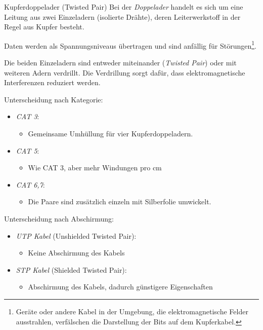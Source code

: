 \begin{defi}{Kupferdoppelader (Twisted Pair)}
    Bei der \emph{Doppelader} handelt es sich um eine Leitung aus zwei Einzeladern (isolierte Drähte), deren Leiterwerkstoff in der Regel aus Kupfer besteht.

    Daten werden als Spannungsniveaus übertragen und sind anfällig für Störungen\footnote{Geräte oder andere Kabel in der Umgebung, die elektromagnetische Felder ausstrahlen, verfälschen die Darstellung der Bits auf dem Kupferkabel.}.

    Die beiden Einzeladern sind entweder miteinander (\emph{Twisted Pair}) oder mit weiteren Adern verdrillt.
    Die Verdrillung sorgt dafür, dass elektromagnetische Interferenzen reduziert werden.

    Unterscheidung nach Kategorie:
    \begin{itemize}
        \item \emph{CAT 3}:
              \begin{itemize}
                  \item Gemeinsame Umhüllung für vier Kupferdoppeladern.
              \end{itemize}
        \item \emph{CAT 5}:
              \begin{itemize}
                  \item Wie CAT 3, aber mehr Windungen pro cm
              \end{itemize}
        \item \emph{CAT 6,7}:
              \begin{itemize}
                  \item Die Paare sind zusätzlich einzeln mit Silberfolie umwickelt.
              \end{itemize}
    \end{itemize}

    Unterscheidung nach Abschirmung:
    \begin{itemize}
        \item \emph{UTP Kabel} (Unshielded Twisted Pair):
              \begin{itemize}
                  \item Keine Abschirmung des Kabels
              \end{itemize}
        \item \emph{STP Kabel} (Shielded Twisted Pair):
              \begin{itemize}
                  \item Abschirmung des Kabels, dadurch günstigere Eigenschaften
              \end{itemize}
    \end{itemize}
\end{defi}

